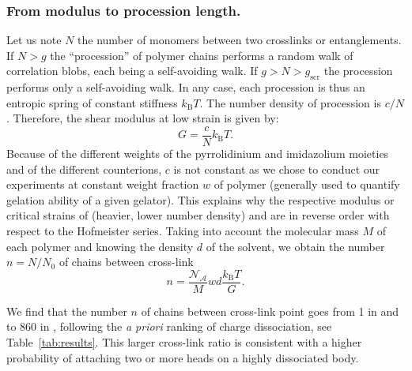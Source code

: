 \documentclass[twoside,twocolumn,9pt]{article}
\begin{document}
\subsubsection{From modulus to procession length.}

Let us note $N$ the number of monomers between two crosslinks or entanglements. If $N>g$ the ``procession'' of polymer chains performs a random walk of correlation blobs, each being a self-avoiding walk. If $g>N>g_\mathrm{scr}$ the procession performs only a self-avoiding walk. In any case, each procession is thus an entropic spring of constant stiffness $k_\mathrm{B}T$. The number density of procession is $c/N$. Therefore, the shear modulus at low strain is given by:
\begin{equation}
G = \frac{c}{N}k_\mathrm{B}T.
\label{eq:G}
\end{equation}
Because of the different weights of the pyrrolidinium and imidazolium moieties and of the different counterions, $c$ is not constant as we chose to conduct our experiments at constant weight fraction $w$ of polymer (generally used to quantify gelation ability of a given gelator). This explains why the respective modulus or critical strains of  (heavier, lower number density) and  are in reverse order with respect to the Hofmeister series. Taking into account the molecular mass $M$ of each polymer and  knowing the density $d$ of the solvent, we obtain the number $n = N/N_0$ of chains between cross-link
\begin{equation}
n = \frac{\mathcal{N_A}}{M} w d \frac{k_\mathrm{B}T}{G}.
\label{eq:n}
\end{equation}

We find that the number $n$ of chains between cross-link point goes from 1 in  and  to 860 in , following the \textit{a priori} ranking of charge dissociation, see Table~\ref{tab:results}. This larger cross-link ratio is consistent with a higher probability of attaching two or more heads on a highly dissociated body.
\end{document}
